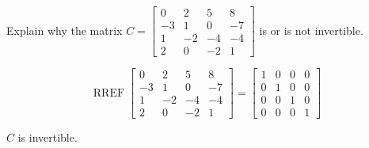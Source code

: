 
\begin{exerciseStatement}


Explain why the matrix \(C= \left[\begin{array}{cccc}
0 & 2 & 5 & 8 \\
-3 & 1 & 0 & -7 \\
1 & -2 & -4 & -4 \\
2 & 0 & -2 & 1
\end{array}\right] \) is or is not invertible.


\end{exerciseStatement}
    
\begin{exerciseAnswer} 


\[\operatorname{RREF} \left[\begin{array}{cccc}
0 & 2 & 5 & 8 \\
-3 & 1 & 0 & -7 \\
1 & -2 & -4 & -4 \\
2 & 0 & -2 & 1
\end{array}\right] = \left[\begin{array}{cccc}
1 & 0 & 0 & 0 \\
0 & 1 & 0 & 0 \\
0 & 0 & 1 & 0 \\
0 & 0 & 0 & 1
\end{array}\right] \]

\(C\) is invertible.
\end{exerciseAnswer}
    
